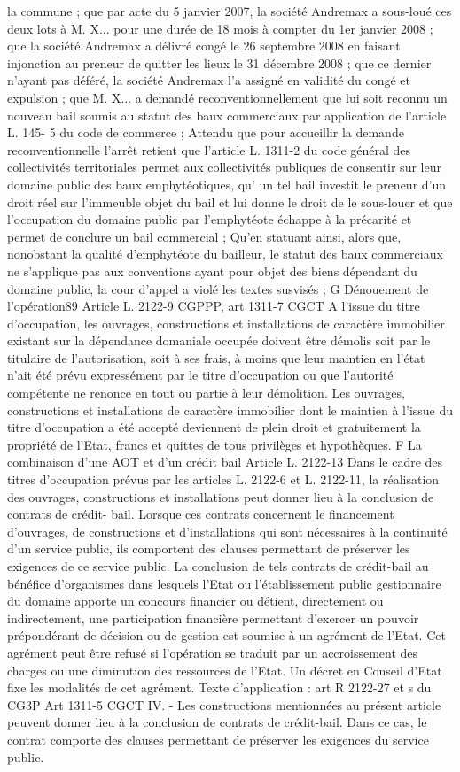 \documentclass[11pt,a4paper]{report}
\begin{document}
la commune ; que par acte du 5 janvier 2007, la société Andremax a sous-loué ces deux lots à M. X... pour une
durée de 18 mois à compter du 1er janvier 2008 ; que la société Andremax a délivré congé le 26 septembre 2008
en faisant injonction au preneur de quitter les lieux le 31 décembre 2008 ; que ce dernier n'ayant pas déféré, la
société Andremax l'a assigné en validité du congé et expulsion ; que M. X... a demandé reconventionnellement
que lui soit reconnu un nouveau bail soumis au statut des baux commerciaux par application de l'article L. 145-
5 du code de commerce ;
Attendu que pour accueillir la demande reconventionnelle l'arrêt retient que l'article L. 1311-2 du code général
des collectivités territoriales permet aux collectivités publiques de consentir sur leur domaine public des baux
emphytéotiques, qu' un tel bail investit le preneur d'un droit réel sur l'immeuble objet du bail et lui donne le droit
de le sous-louer et que l'occupation du domaine public par l'emphytéote échappe à la précarité et permet de
conclure un bail commercial ;
Qu'en statuant ainsi, alors que, nonobstant la qualité d'emphytéote du bailleur, le statut des baux commerciaux
ne s'applique pas aux conventions ayant pour objet des biens dépendant du domaine public, la cour d'appel a
violé les textes susvisés ;
G Dénouement de l’opération89
Article L. 2122-9 CGPPP, art 1311-7 CGCT
A l'issue du titre d'occupation, les ouvrages, constructions et installations de caractère immobilier existant sur la
dépendance domaniale occupée doivent être démolis soit par le titulaire de l'autorisation, soit à ses frais, à
moins que leur maintien en l'état n'ait été prévu expressément par le titre d'occupation ou que l'autorité
compétente ne renonce en tout ou partie à leur démolition.
Les ouvrages, constructions et installations de caractère immobilier dont le maintien à l'issue du titre
d'occupation a été accepté deviennent de plein droit et gratuitement la propriété de l'Etat, francs et quittes de
tous privilèges et hypothèques.
F La combinaison d’une AOT et d’un crédit bail
Article L. 2122-13 Dans le cadre des titres d'occupation prévus par les articles L. 2122-6 et L. 2122-11, la
réalisation des ouvrages, constructions et installations peut donner lieu à la conclusion de contrats de crédit-
bail. Lorsque ces contrats concernent le financement d'ouvrages, de constructions et d'installations qui sont
nécessaires à la continuité d'un service public, ils comportent des clauses permettant de préserver les exigences
de ce service public.
La conclusion de tels contrats de crédit-bail au bénéfice d'organismes dans lesquels l'Etat ou l'établissement
public gestionnaire du domaine apporte un concours financier ou détient, directement ou indirectement, une
participation financière permettant d'exercer un pouvoir prépondérant de décision ou de gestion est soumise à
un agrément de l'Etat. Cet agrément peut être refusé si l'opération se traduit par un accroissement des charges
ou une diminution des ressources de l'Etat. Un décret en Conseil d'Etat fixe les modalités de cet agrément.
Texte d’application : art R 2122-27 et s du CG3P
Art 1311-5 CGCT IV. - Les constructions mentionnées au présent article peuvent donner lieu à la conclusion
de contrats de crédit-bail. Dans ce cas, le contrat comporte des clauses permettant de préserver les exigences du
service public.
	\tableofcontents
\end{document}

